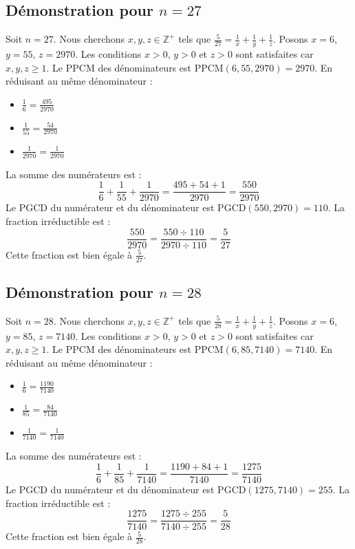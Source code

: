 \documentclass[11pt,a4paper]{article}
\begin{document}
\subsection{Démonstration pour $n = 27$}
Soit $n = 27$. Nous cherchons $x, y, z \in \mathbb{Z}^{+}$ tels que $\frac{5}{27} = \frac{1}{x} + \frac{1}{y} + \frac{1}{z}$.
Posons $x = 6$, $y = 55$, $z = 2970$.
Les conditions $x > 0$, $y > 0$ et $z > 0$ sont satisfaites car $x, y, z \geq 1$.
Le PPCM des dénominateurs est $\text{PPCM}(6, 55, 2970) = 2970$.
En réduisant au même dénominateur :
\begin{itemize}
    \item $\frac{1}{6} = \frac{495}{2970}$
    \item $\frac{1}{55} = \frac{54}{2970}$
    \item $\frac{1}{2970} = \frac{1}{2970}$
\end{itemize}
La somme des numérateurs est :
$$ \frac{1}{6} + \frac{1}{55} + \frac{1}{2970} = \frac{495 + 54 + 1}{2970} = \frac{550}{2970} $$
Le PGCD du numérateur et du dénominateur est $\text{PGCD}(550, 2970) = 110$.
La fraction irréductible est :
$$ \frac{550}{2970} = \frac{550 \div 110}{2970 \div 110} = \frac{5}{27} $$
Cette fraction est bien égale à $\frac{5}{27}$.

\subsection{Démonstration pour $n = 28$}
Soit $n = 28$. Nous cherchons $x, y, z \in \mathbb{Z}^{+}$ tels que $\frac{5}{28} = \frac{1}{x} + \frac{1}{y} + \frac{1}{z}$.
Posons $x = 6$, $y = 85$, $z = 7140$.
Les conditions $x > 0$, $y > 0$ et $z > 0$ sont satisfaites car $x, y, z \geq 1$.
Le PPCM des dénominateurs est $\text{PPCM}(6, 85, 7140) = 7140$.
En réduisant au même dénominateur :
\begin{itemize}
    \item $\frac{1}{6} = \frac{1190}{7140}$
    \item $\frac{1}{85} = \frac{84}{7140}$
    \item $\frac{1}{7140} = \frac{1}{7140}$
\end{itemize}
La somme des numérateurs est :
$$ \frac{1}{6} + \frac{1}{85} + \frac{1}{7140} = \frac{1190 + 84 + 1}{7140} = \frac{1275}{7140} $$
Le PGCD du numérateur et du dénominateur est $\text{PGCD}(1275, 7140) = 255$.
La fraction irréductible est :
$$ \frac{1275}{7140} = \frac{1275 \div 255}{7140 \div 255} = \frac{5}{28} $$
Cette fraction est bien égale à $\frac{5}{28}$.
\end{document}
